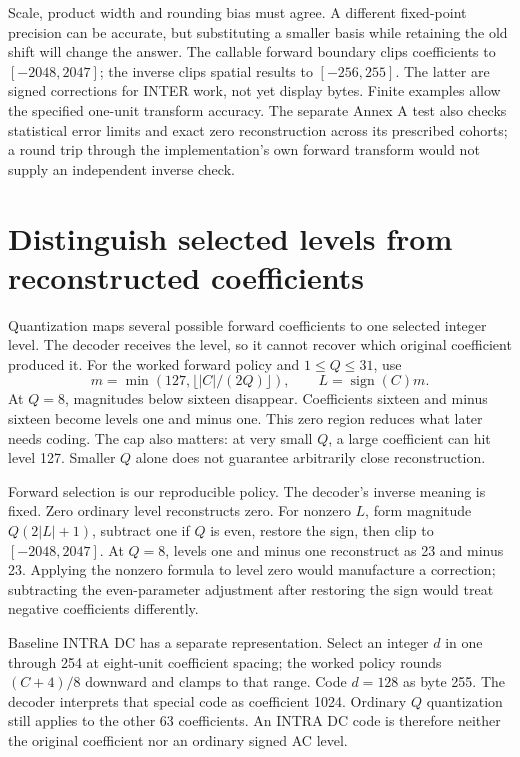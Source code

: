 Scale, product width and rounding bias must agree. A different fixed-point
precision can be accurate, but substituting a smaller basis while retaining the
old shift will change the answer. The callable forward boundary clips coefficients
to $[-2048,2047]$; the inverse clips spatial results to $[-256,255]$. The latter
are signed corrections for INTER work, not yet display bytes. Finite examples
allow the specified one-unit transform accuracy. The separate Annex A test also
checks statistical error limits and exact zero reconstruction across its prescribed
cohorts; a round trip through the implementation's own forward transform would
not supply an independent inverse check.

\section{Distinguish selected levels from reconstructed coefficients}

Quantization maps several possible forward coefficients to one selected integer
level. The decoder receives the level, so it cannot recover which original
coefficient produced it. For the worked forward policy and $1\leq Q\leq31$, use
\[
  m=\min(127,\lfloor |C|/(2Q)\rfloor),\qquad L=\operatorname{sign}(C)m.
\]
At $Q=8$, magnitudes below sixteen disappear. Coefficients sixteen and minus
sixteen become levels one and minus one. This zero region reduces what later
needs coding. The cap also matters: at very small $Q$, a large coefficient can
hit level 127. Smaller $Q$ alone does not guarantee arbitrarily close reconstruction.

Forward selection is our reproducible policy. The decoder's inverse meaning is
fixed. Zero ordinary level reconstructs zero. For nonzero $L$, form magnitude
$Q(2|L|+1)$, subtract one if $Q$ is even, restore the sign, then clip to
$[-2048,2047]$. At $Q=8$, levels one and minus one reconstruct as 23 and minus
23. Applying the nonzero formula to level zero would manufacture a correction;
subtracting the even-parameter adjustment after restoring the sign would treat
negative coefficients differently.

Baseline INTRA DC has a separate representation. Select an integer $d$ in
one through 254 at eight-unit coefficient spacing; the worked policy rounds
$(C+4)/8$ downward and clamps to that range. Code $d=128$ as byte 255.
The decoder interprets that special code as coefficient 1024. Ordinary $Q$
quantization still applies to the other 63 coefficients. An INTRA DC code is
therefore neither the original coefficient nor an ordinary signed AC level.

